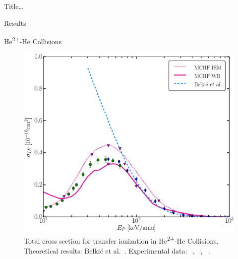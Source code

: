 \documentclass[letterpaper, 10 pt]{report}
\begin{document}
\begin{chapter}{ Title\dots \label{chap:p-he2p-he}}
\begin{section}{Results \label{sec:phe2p-res}}
\begin{subsection}{\texorpdfstring{He\textsuperscript{2+}}{He2+}-He Collisions 
                         \label{sec:he2phe-res}}
\begin{figure}[ht]
\begin{minipage}{.49\linewidth}
               \centering
               \includegraphics[width = \linewidth]{./images/he2phe/he2phe-IP.eps}
               \caption[Total cross section for transfer ionization in He\textsuperscript{2+}-He
                        Collisions.]{Total cross section for transfer ionization in
                        He\textsuperscript{2+}-He Collisions. Theoretical results: Belki\'{c}
                        et al.~\cite{BMM-97}.
                        Experimental data: {\color{blue}{$\blacklozenge$}}~\cite{SG85},
                        {\color{OliveGreen}{$\bullet$}}~\cite{SG89},
                        {\color{RedViolet}{$\blacktriangledown$}}~\cite{Dubois87}. \label{fig:he2phe-ip}}
            \end{minipage} \hspace{0.04\linewidth} %
            \begin{minipage}{.49\linewidth}


\end{minipage}
\end{figure}
\end{subsection}
\end{section}
\end{chapter}
\end{document}
